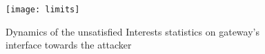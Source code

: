 















\begin{figure}[htbp]
  \centering
  \texttt{[image: limits]}
  \caption{Dynamics of the unsatisfied Interests statistics on gateway's interface towards the attacker}
  \label{fig:ratio example}
\end{figure}


